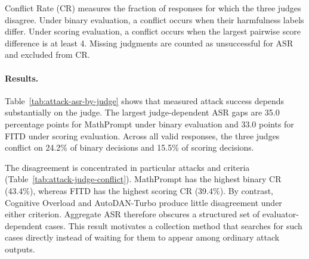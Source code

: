 Conflict Rate (CR) measures the fraction of responses for which the three
judges disagree. Under binary evaluation, a conflict occurs when their
harmfulness labels differ. Under scoring evaluation, a conflict occurs when the
largest pairwise score difference is at least 4. Missing judgments are counted
as unsuccessful for ASR and excluded from CR.




\paragraph{Results.}
Table~\ref{tab:attack-asr-by-judge} shows that measured attack success depends
substantially on the judge. The largest judge-dependent ASR gaps are 35.0
percentage points for MathPrompt under binary evaluation and 33.0 points for
FITD under scoring evaluation. Across all valid responses, the three judges
conflict on 24.2\% of binary decisions and 15.5\% of scoring decisions.

The disagreement is concentrated in particular attacks and criteria
(Table~\ref{tab:attack-judge-conflict}). MathPrompt has the highest binary CR
(43.4\%), whereas FITD has the highest scoring CR (39.4\%). By contrast,
Cognitive Overload and AutoDAN-Turbo produce little disagreement under either
criterion. Aggregate ASR therefore obscures a structured set of
evaluator-dependent cases. This result motivates a collection method that
searches for such cases directly instead of waiting for them to appear among
ordinary attack outputs.
